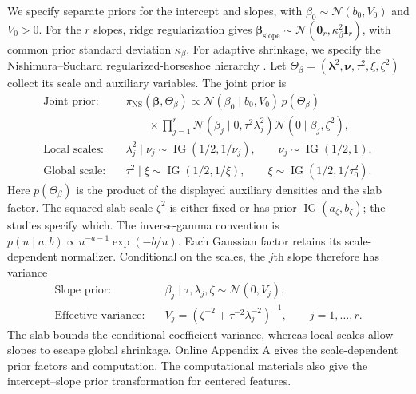 \documentclass[12pt,letterpaper]{article}
\numberwithin{equation}{section}
\newcommand{\Normal}{\mathcal{N}}
\newcommand{\vect}[1]{\bm{#1}}
\newcommand{\mat}[1]{\bm{#1}}
\DeclareMathOperator{\IG}{IG}
\newcommand{\Id}[1]{\mat I_{#1}}
\newcommand{\zeros}[1]{\vect 0_{#1}}
\begin{document}
We specify separate priors for the intercept and slopes, with
\(\beta_0\sim\Normal(b_0,V_0)\) and \(V_0>0\). For the \(r\) slopes,
ridge regularization gives
\(\vect\beta_{\mathrm{slope}}\sim
\Normal(\zeros{r},\kappa_\beta^2\Id{r})\), with common prior standard
deviation \(\kappa_\beta\). For adaptive shrinkage, we specify the
Nishimura--Suchard regularized-horseshoe hierarchy
\citep{CarvalhoPolsonScott2010HS,PiironenVehtari2017RHS,
MakalicSchmidt2016SimpleSampler,NishimuraSuchard2023SSS}. Let
\(\Theta_\beta=(\vect\lambda^2,\vect\nu,\tau^2,\xi,\zeta^2)\)
collect its scale and auxiliary variables. The joint prior is
\begin{equation}
\begin{aligned}
\text{Joint prior:}\quad
&\pi_{\mathrm{NS}}(\vect\beta,\Theta_\beta)
 \propto\Normal(\beta_0\mid b_0,V_0)\,p(\Theta_\beta)\\
&\qquad\times\prod_{j=1}^r
 \Normal(\beta_j\mid0,\tau^2\lambda_j^2)
 \Normal(0\mid\beta_j,\zeta^2),\\
\text{Local scales:}\quad
&\lambda_j^2\mid\nu_j\sim\IG(1/2,1/\nu_j),\qquad
 \nu_j\sim\IG(1/2,1),\\
\text{Global scale:}\quad
&\tau^2\mid\xi\sim\IG(1/2,1/\xi),\qquad
 \xi\sim\IG(1/2,1/\tau_0^2).
\end{aligned}
\label{eq:rhs-product-main}
\end{equation}
Here \(p(\Theta_\beta)\) is the product of the displayed auxiliary
densities and the slab factor. The squared slab scale \(\zeta^2\) is
either fixed or has prior \(\IG(a_\zeta,b_\zeta)\); the studies specify
which. The inverse-gamma convention is
\(p(u\mid a,b)\propto u^{-a-1}\exp(-b/u)\).
Each Gaussian factor retains its scale-dependent normalizer. Conditional
on the scales, the \(j\)th slope therefore has variance
\begin{equation}
\begin{aligned}
\text{Slope prior:}\quad
&\beta_j\mid\tau,\lambda_j,\zeta\sim\Normal(0,V_j),\\
\text{Effective variance:}\quad
&V_j=\left(\zeta^{-2}+\tau^{-2}\lambda_j^{-2}\right)^{-1},
\qquad j=1,\ldots,r.
\end{aligned}
\label{eq:rhs-var}
\end{equation}
The slab bounds the conditional coefficient variance, whereas local scales
allow slopes to escape global shrinkage. Online Appendix A gives the
scale-dependent prior factors and computation. The computational materials
also give the intercept--slope prior transformation for centered features.
\end{document}
